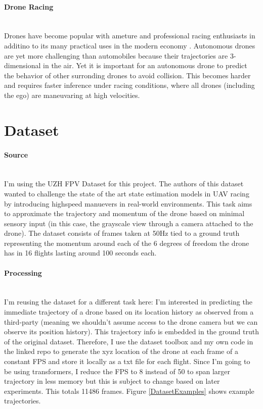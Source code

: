 \documentclass{article}
\begin{document}
\paragraph{Drone Racing}$ $
\\Drones have become popular with ameture and professional racing enthusiasts in additino to its many practical uses in the modern economy \cite{Delmerico19icra}. Autonomous drones are yet more challenging than automobiles because their trajectories are 3-dimensional in the air. Yet it is important for an autonomous drone to predict the behavior of other surronding drones to avoid collision. This becomes harder and requires faster inference under racing conditions, where all drones (including the ego) are maneuvaring at high velocities.  

\section{Dataset}
\paragraph{Source}$ $
\\I'm using the UZH FPV Dataset \cite{Delmerico19icra} for this project. The authors of this dataset wanted to challenge the state of the art state estimation models in UAV racing by introducing highspeed manuevers in real-world environments. This task aims to approximate the trajectory and momentum of the drone based on minimal sensory input (in this case, the grayscale view through a camera attached to the drone). The dataset consists of frames taken at 50Hz tied to a ground truth representing the momentum around each of the 6 degrees of freedom the drone has in 16 flights lasting around 100 seconds each. 
\paragraph{Processing}$ $
\\I'm reusing the dataset for a different task here: I'm interested in predicting the immediate trajectory of a drone based on its location history as observed from a third-party (meaning we shouldn't assume access to the drone camera but we can observe its position history). This trajectory info is embedded in the ground truth of the original dataset. Therefore, I use the dataset toolbox and my own code in the linked repo to generate the xyz location of the drone at each frame of a constant FPS and store it locally as a txt file for each flight.  Since I'm going to be using transformers, I reduce the FPS to 8 instead of 50 to span larger trajectory in less memory but this is subject to change based on later experiments.  This totals 11486 frames.  Figure \ref{DatasetExamples} shows example trajectories.
\end{document}
